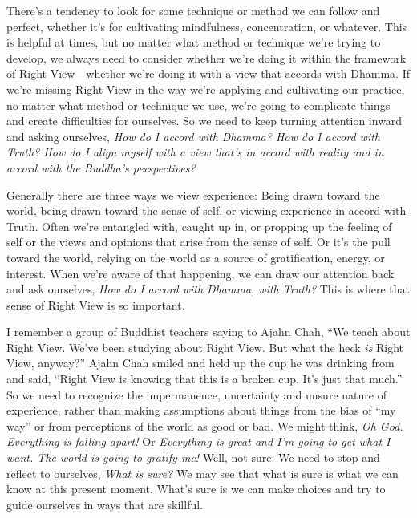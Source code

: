 
There's a tendency to look for some technique or method we can follow 
and perfect, whether it's for cultivating mindfulness, concentration, 
or whatever. This is helpful at times, but no matter what method or 
technique we're trying to develop, we always need to consider whether 
we're doing it within the framework of Right View---whether we're doing 
it with a view that accords with Dhamma. If we're missing Right View in 
the way we're applying and cultivating our practice, no matter what 
method or technique we use, we're going to complicate things and create 
difficulties for ourselves. So we need to keep turning attention inward 
and asking ourselves, \emph{How do I accord with Dhamma? How do I 
accord with Truth? How do I align myself with a view that's in accord 
with reality and in accord with the Buddha's perspectives?}

Generally there are three ways we view experience: Being drawn toward 
the world, being drawn toward the sense of self, or viewing experience 
in accord with Truth. Often we're entangled with, caught up in, or 
propping up the feeling of self or the views and opinions that arise 
from the sense of self. Or it's the pull toward the world, relying on 
the world as a source of gratification, energy, or interest. When we're 
aware of that happening, we can draw our attention back and ask 
ourselves, \emph{How do I accord with Dhamma, with Truth?} This is 
where that sense of Right View is so important.

I remember a group of Buddhist teachers saying to Ajahn Chah, ``We 
teach about Right View. We've been studying about Right View. But what 
the heck \emph{is} Right View, anyway?'' Ajahn Chah smiled and held up 
the cup he was drinking from and said, ``Right View is knowing that 
this is a broken cup. It's just that much.'' So we need to recognize 
the impermanence, uncertainty and unsure nature of experience, rather 
than making assumptions about things from the bias of ``my way'' or 
from perceptions of the world as good or bad. We might think, \emph{Oh 
God. Everything is falling apart!} Or \emph{Everything is great and I'm 
going to get what I want. The world is going to gratify me!} Well, not 
sure. We need to stop and reflect to ourselves, \emph{What is sure?} We 
may see that what is sure is what we can know at this present moment. 
What's sure is we can make choices and try to guide ourselves in ways 
that are skillful.

